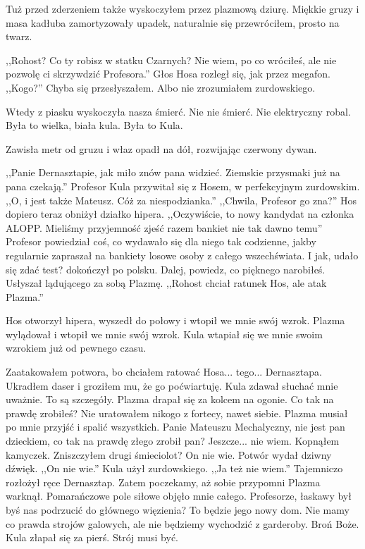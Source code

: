 Tuż przed zderzeniem także wyskoczyłem przez plazmową dziurę.
Miękkie gruzy i masa kadłuba zamortyzowały upadek, naturalnie się przewróciłem, prosto na twarz.

\begin{dialogue}
\ds{} ,,Rohost? Co ty robisz w statku Czarnych? Nie wiem, po co wróciłeś, ale nie pozwolę ci skrzywdzić Profesora.'' \dm{} Głos Hosa rozległ się, jak przez megafon.
\ds{} ,,Kogo?'' \dm{} Chyba się przesłyszałem. Albo nie zrozumiałem zurdowskiego.
\end{dialogue}

Wtedy z piasku wyskoczyła nasza śmierć.
Nie nie śmierć. Nie elektryczny robal.
Była to wielka, biała kula.
Była to Kula.

Zawisła metr od gruzu i właz opadł na dół, rozwijając czerwony dywan.
\begin{dialogue}
\ds{} ,,Panie Dernasztapie, jak miło znów pana widzieć. Ziemskie przysmaki już na pana czekają.'' \dm{} Profesor Kula przywitał się z Hosem, w perfekcyjnym zurdowskim. \dm{} ,,O, i jest także Mateusz. Cóż za niespodzianka.''
\ds{} ,,Chwila, Profesor go zna?'' \dm{} Hos dopiero teraz obniżył działko hipera.
\ds{} ,,Oczywiście, to nowy kandydat na członka ALOPP. Mieliśmy przyjemność zjeść razem bankiet nie tak dawno temu'' \dm{} 
Profesor powiedział coś, co wydawało się dla niego tak codzienne, jakby regularnie zapraszał na bankiety losowe osoby z całego wszechświata. \dm{} 
I jak, udało się zdać test? \dm{} dokończył po polsku.
\ds{} Dalej, powiedz, co pięknego narobiłeś. \dm{} Usłyszał lądującego za sobą Plazmę. \dm{} ,,Rohost chciał ratunek Hos, ale atak Plazma.''
\end{dialogue}

Hos otworzył hipera, wyszedł do połowy i wtopił we mnie swój wzrok.
Plazma wylądował i wtopił we mnie swój wzrok.
Kula wtapiał się we mnie swoim wzrokiem już od pewnego czasu.

\begin{dialogue}
\ds{} Zaatakowałem potwora, bo chciałem ratować Hosa... tego... Dernasztapa. Ukradłem daser i groziłem mu, że go poćwiartuję. \dm{} Kula zdawał słuchać mnie uważnie.
\ds{} To są szczegóły. \dm{} Plazma drapał się za kolcem na ogonie. \dm{} Co tak na prawdę zrobiłeś?
\ds{} Nie uratowałem nikogo z fortecy, nawet siebie. Plazma musiał po mnie przyjść i spalić wszystkich.
\ds{} Panie Mateuszu Mechalyczny, nie jest pan dzieckiem, co tak na prawdę złego zrobił pan?
\ds{} Jeszcze... nie wiem. \dm{} Kopnąłem kamyczek. \dm{} Zniszczyłem drugi śmieciolot?
\ds{} On nie wie. \dm{} Potwór wydał dziwny dźwięk.
\ds{} ,,On nie wie.'' \dm{} Kula użył zurdowskiego.
\ds{} ,,Ja też nie wiem.'' \dm{} Tajemniczo rozłożył ręce Dernasztap.
\ds{} Zatem poczekamy, aż sobie przypomni \dm{} Plazma warknął. Pomarańczowe pole siłowe objęło mnie całego. \dm{} 
Profesorze, łaskawy był byś nas podrzucić do głównego więzienia? To będzie jego nowy dom.
Nie mamy co prawda strojów galowych, ale nie będziemy wychodzić z garderoby.
\ds{} Broń Boże. \dm{} Kula złapał się za pierś. \dm{} Strój musi być.
\end{dialogue}

